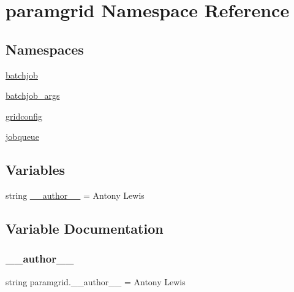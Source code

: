 \hypertarget{namespaceparamgrid}{}\section{paramgrid Namespace Reference}
\label{namespaceparamgrid}
\subsection*{Namespaces}
\begin{DoxyCompactItemize}
\item 
 \mbox{\hyperlink{namespaceparamgrid_1_1batchjob}{batchjob}}
\item 
 \mbox{\hyperlink{namespaceparamgrid_1_1batchjob__args}{batchjob\+\_\+args}}
\item 
 \mbox{\hyperlink{namespaceparamgrid_1_1gridconfig}{gridconfig}}
\item 
 \mbox{\hyperlink{namespaceparamgrid_1_1jobqueue}{jobqueue}}
\end{DoxyCompactItemize}
\subsection*{Variables}
\begin{DoxyCompactItemize}
\item 
string \mbox{\hyperlink{namespaceparamgrid_a4c7f403114d21d7c75fe8def7a891f15}{\+\_\+\+\_\+author\+\_\+\+\_\+}} = \textquotesingle{}Antony Lewis\textquotesingle{}
\end{DoxyCompactItemize}


\subsection{Variable Documentation}
\mbox{\label{namespaceparamgrid_a4c7f403114d21d7c75fe8def7a891f15}} 
\subsubsection{\texorpdfstring{\+\_\+\+\_\+author\+\_\+\+\_\+}{\_\_author\_\_}}
{\footnotesize\ttfamily string paramgrid.\+\_\+\+\_\+author\+\_\+\+\_\+ = \textquotesingle{}Antony Lewis\textquotesingle{}\hspace{0.3cm}{\ttfamily [private]}}

